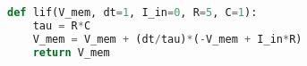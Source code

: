 \begin{lstlisting}[language=Python, caption={Python implementation of the action potential decaying of a LIF: $I_{in} = 0$}, label={lst:membranepotentialdecay}]
def lif(V_mem, dt=1, I_in=0, R=5, C=1):
	tau = R*C
	V_mem = V_mem + (dt/tau)*(-V_mem + I_in*R)
	return V_mem
\end{lstlisting}